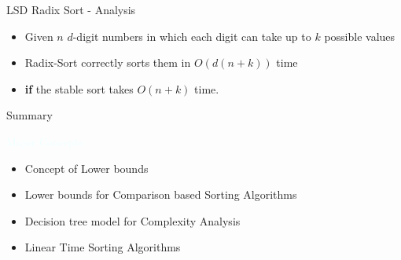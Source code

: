 \documentclass{beamer}
\newcommand{\tblue}[1]{{\Large {\textcolor{azure}{#1}}}}
\begin{document}
\begin{frame}{LSD Radix Sort - Analysis}
\begin{itemize}
\item Given $n$ $d$-digit numbers in which each digit can take up to $k$ possible values
\item Radix-Sort correctly sorts them in $O( d(n+k) )$ time
\item {\bf if} the stable sort takes $O(n+k)$ time.
\end{itemize}
\end{frame}


\begin{frame}{Summary}

\tblue{Major Concepts:}
\begin{itemize}
\item Concept of Lower bounds
\item Lower bounds for Comparison based Sorting Algorithms
\item Decision tree model for Complexity Analysis
\item Linear Time Sorting Algorithms
\end{itemize}
\end{frame}
\end{document}
